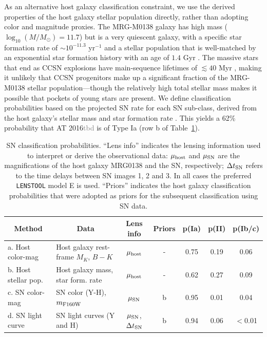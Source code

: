 \documentclass[12pt,dvipsnames]{article}
\def\SNABC{AT 2016{\textcolor{Gray}{tbd}}\xspace}
\def\lenstool{{\tt LENSTOOL}\xspace}
\begin{document}
As an alternative host galaxy classification constraint, we use the derived properties of the host galaxy stellar population directly,  rather than adopting color and magnitude proxies. The MRG-M0138 galaxy has high mass ($\log_{10}(M/M_{\odot})=11.7$) but is a very quiescent galaxy, with a specific star formation rate of $\sim10^{-11.3}$ yr$^{-1}$  and a stellar population that is well-matched by an exponential star formation history with an age of $1.4$ Gyr \cite{newman_resolving_2018}. 
The massive stars that end as CCSN explosions have main-sequence lifetimes of $\lesssim 40$ Myr \cite{smartt_progenitors_2009},  making it unlikely that CCSN progenitors make up a significant fraction of the MRG-M0138 stellar population---though the relatively high total stellar mass makes it possible that pockets of young stars are present.  We define classification probabilities based on the projected SN rate for each SN sub-class, derived from the host galaxy's stellar mass and star formation rate \cite{li_rates_2012}.  This yields a 62\% probability that \SNABC is of Type Ia (row b of Table~\ref{tab:classification}).

\begin{table}[tb]
    \centering
    \begin{tabular}{lp{1.5in}cc|ccc}
        \multicolumn{1}{c}{Method} & \multicolumn{1}{c}{Data} & Lens info & Priors & p(Ia) & p(II) & p(Ib/c) \\
        \midrule
        a. Host color-mag & Host galaxy rest-frame $M_K$, $B-K$ & $\mu_{\rm host}$ & - & 0.75 & 0.19 & 0.06\\
        b. Host stellar pop. & Host galaxy mass, star form. rate & $\mu_{\rm host}$ & - & 0.62 & 0.27 & 0.09 \\
        c. SN color-mag & SN color (Y-H), $m_{\rm F160W}$ & $\mu_{\rm SN}$ & b & 0.95 & 0.01 & 0.04\\
        d. SN light curve & SN light curves (Y and H) & $\mu_{\rm SN}$, $\Delta t_{\rm SN}$ & b & 0.94 & 0.06 & $<$0.01 \\
    \end{tabular}
    \caption{SN classification probabilities. ``Lens info'' indicates the lensing information used to interpret or derive the 
    observational data: $\mu_{\rm host}$ and $\mu_{\rm SN}$ are the magnifications of the host galaxy MRG0138 and the SN, respectively; $\Delta t_{\rm SN}$ refers to the time delays between SN images 1, 2 and 3. In all cases the preferred \lenstool model E is used.  ``Priors'' indicates the host galaxy classification probabilities that were adopted as priors for the subsequent classification using SN data.}
    \label{tab:classification}
\end{table}
\end{document}
